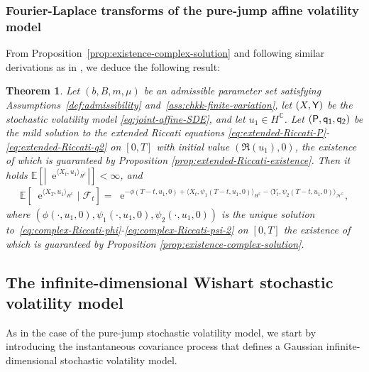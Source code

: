 \documentclass[10pt,a4paper,reqno]{amsart}
\newcommand*\E{\mathop{}\!\mathrm{e}}
\numberwithin{equation}{section}
\newtheorem{theorem}{Theorem}[section]
\theoremstyle{plain}
\theoremstyle{definition}
\theoremstyle{example}
\newcommand{\cH}{\mathcal{H}}
\newcommand{\EX}[1]{\mathbb{E}\left[#1\right]}
\begin{document}
\subsubsection{Fourier-Laplace transforms of the pure-jump affine volatility model}
From Proposition~\ref{prop:existence-complex-solution}
and following similar derivations as in \cite[Theorem 2.26 and Section 5.3]{KM15}, we deduce the following result:
\begin{theorem}\label{prop:complex-extension}
Let $(b,B,m,\mu)$ be an admissible parameter set satisfying Assumptions~\ref{def:admissibility} and~\ref{ass:chkk-finite-variation},
let $(X,\sf Y)$ be the stochastic volatility model \eqref{eq:joint-affine-SDE}, and let $u_1 \in H^\mathbb{C}$.
Let $(\sf P, \sf q_1, \sf q_2)$ be the mild solution to the extended Riccati equations \eqref{eq:extended-Riccati-P}-\eqref{eq:extended-Riccati-q2} on $[0,T]$ with initial value $(\Re(u_1), 0)$, the existence of which is guaranteed by Proposition \ref{prop:extended-Riccati-existence}. Then 
it holds 
 $\EX{|\E^{\langle X_{t}, u_{1}\rangle_{H^{\mathbb{C}}}}|}<\infty$, and
 \begin{align*}
   \EX{\E^{\langle X_{T},u_{1}\rangle_{H^{\mathbb{C}}}}\mid \mathcal{F}_t}=\E^{-\phi(T-t,u_{1},0)+\langle
   X_t,\psi_{1}(T-t,u_{1},0)\rangle_{H^\mathbb{C}}-\langle Y_t, \psi_{2}(T-t,u_{1},0)\rangle_{\cH^\mathbb{C}}},  
 \end{align*}
 where $(\phi(\cdot,u_1,0), \psi_1(\cdot,u_1,0), \psi_2(\cdot,u_1,0))$ is the unique solution 
to~\eqref{eq:complex-Riccati-phi}-\eqref{eq:complex-Riccati-psi-2} on $[0,T]$ the existence of which is guaranteed by Proposition \ref{prop:existence-complex-solution}.
\end{theorem}


\subsection{The infinite-dimensional Wishart stochastic
volatility model}\label{sec:OU-Wishart}

As in the case of the pure-jump stochastic volatility model, we start by introducing the instantaneous covariance process that defines a Gaussian infinite-dimensional stochastic volatility model.
\end{document}
